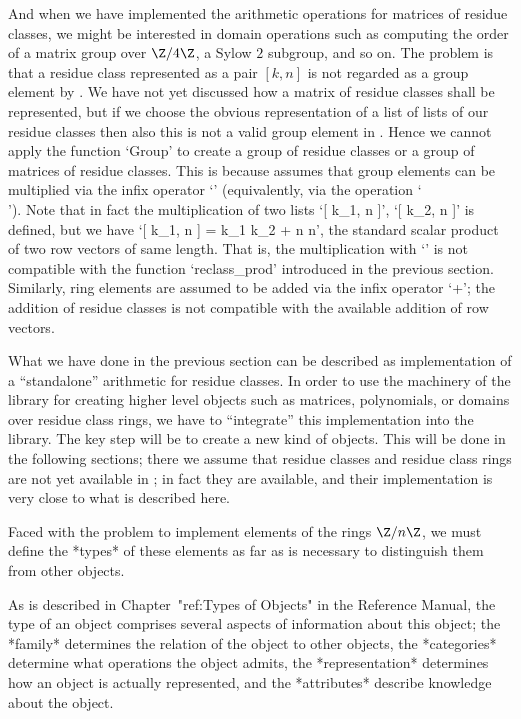 And when we have implemented the arithmetic operations for matrices of
residue classes, we might be interested in domain operations such as
computing the order of a matrix group over $\Z/4\Z$,
a Sylow $2$ subgroup, and so on.
The problem is that a residue class represented as a pair $[ k, n ]$
is not regarded as a group element by {\GAP}.
We have not yet discussed how a matrix of residue classes shall be
represented, but if we choose the obvious representation of a list of
lists of our residue classes then also this is not a valid group element
in {\GAP}.
Hence we cannot apply the function `Group' to create a group of residue
classes or a group of matrices of residue classes.
This is because {\GAP} assumes that group elements can be multiplied via
the infix operator `\*' (equivalently, via the operation `\\\*').
Note that in fact the multiplication of two lists `[ k_1, n ]',
`[ k_2, n ]' is defined, but we have
`[ k_1, n ] \* [ k_2, n ] = k_1 \* k_2 + n \* n', the standard scalar
product of two row vectors of same length.
That is, the multiplication with `\*' is not compatible with the function
`reclass_prod' introduced in the previous section.
Similarly, ring elements are assumed to be added via the infix operator
`+'; the addition of residue classes is not compatible with the available
addition of row vectors.

What we have done in the previous section can be described as
implementation of a ``standalone'' arithmetic for residue classes.
In order to use the machinery of the {\GAP} library for creating higher
level objects such as matrices, polynomials, or domains over residue
class rings,
we have to ``integrate'' this implementation into the {\GAP} library.
The key step will be to create a new kind of {\GAP} objects.
This will be done in the following sections;
there we assume that residue classes and residue class rings are not
yet available in {\GAP};
in fact they are available, and their implementation is very close to
what is described here.



Faced with the problem to implement elements of the rings $\Z/n\Z$,
we must define the *types* of these elements as far as is necessary to
distinguish them from other {\GAP} objects.

As is described in Chapter~"ref:Types of Objects" in the Reference Manual,
the type of an object comprises several aspects of information about this
object;
the *family* determines the relation of the object to other objects,
the *categories* determine what operations the object admits,
the *representation* determines how an object is actually represented,
and the *attributes* describe knowledge about the object.

